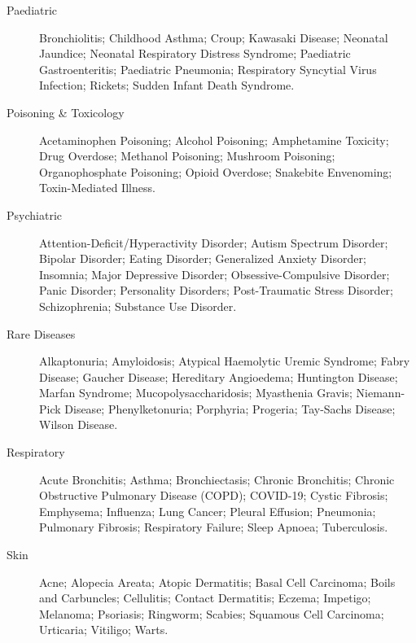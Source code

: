 \begin{description}
\item[Paediatric] Bronchiolitis; Childhood Asthma; Croup; Kawasaki Disease; Neonatal Jaundice; Neonatal Respiratory Distress Syndrome; Paediatric Gastroenteritis; Paediatric Pneumonia; Respiratory Syncytial Virus Infection; Rickets; Sudden Infant Death Syndrome.

\item[Poisoning \& Toxicology] Acetaminophen Poisoning; Alcohol Poisoning; Amphetamine Toxicity; Drug Overdose; Methanol Poisoning; Mushroom Poisoning; Organophosphate Poisoning; Opioid Overdose; Snakebite Envenoming; Toxin-Mediated Illness.

\item[Psychiatric] Attention-Deficit/Hyperactivity Disorder; Autism Spectrum Disorder; Bipolar Disorder; Eating Disorder; Generalized Anxiety Disorder; Insomnia; Major Depressive Disorder; Obsessive-Compulsive Disorder; Panic Disorder; Personality Disorders; Post-Traumatic Stress Disorder; Schizophrenia; Substance Use Disorder.

\item[Rare Diseases] Alkaptonuria; Amyloidosis; Atypical Haemolytic Uremic Syndrome; Fabry Disease; Gaucher Disease; Hereditary Angioedema; Huntington Disease; Marfan Syndrome; Mucopolysaccharidosis; Myasthenia Gravis; Niemann-Pick Disease; Phenylketonuria; Porphyria; Progeria; Tay-Sachs Disease; Wilson Disease.

\item[Respiratory] Acute Bronchitis; Asthma; Bronchiectasis; Chronic Bronchitis; Chronic Obstructive Pulmonary Disease (COPD); COVID-19; Cystic Fibrosis; Emphysema; Influenza; Lung Cancer; Pleural Effusion; Pneumonia; Pulmonary Fibrosis; Respiratory Failure; Sleep Apnoea; Tuberculosis.

\item[Skin] Acne; Alopecia Areata; Atopic Dermatitis; Basal Cell Carcinoma; Boils and Carbuncles; Cellulitis; Contact Dermatitis; Eczema; Impetigo; Melanoma; Psoriasis; Ringworm; Scabies; Squamous Cell Carcinoma; Urticaria; Vitiligo; Warts.
\end{description}
